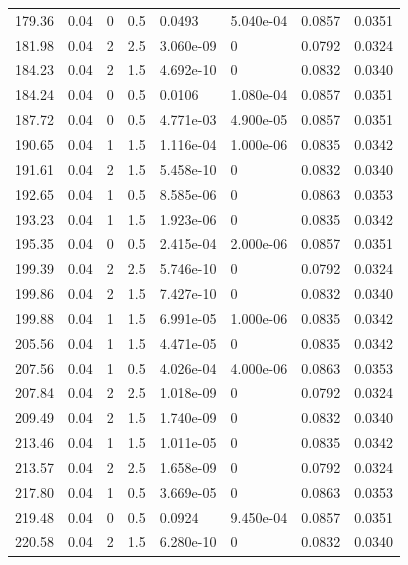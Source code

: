 \documentclass[preview]{standalone}
\begin{document}
{{{\begin{tabular}{L{1.2cm}C{1.2cm} C{0.3cm}C{0.5cm} C{1.4cm}C{1.4cm} C{1.4cm}C{1.4cm}}
  179.36  &  0.04  & 0     & 0.5 &  0.0493  & 5.040e-04  & 0.0857 &  0.0351   \\ 
  181.98  &  0.04  & 2     & 2.5 &  3.060e-09  & 0  & 0.0792 &  0.0324   \\ 
  184.23  &  0.04  & 2     & 1.5 &  4.692e-10  & 0  & 0.0832 &  0.0340   \\ 
  184.24  &  0.04  & 0     & 0.5 &  0.0106  & 1.080e-04  & 0.0857 &  0.0351   \\ 
  187.72  &  0.04  & 0     & 0.5 &  4.771e-03  & 4.900e-05  & 0.0857 &  0.0351   \\ 
  190.65  &  0.04  & 1     & 1.5 &  1.116e-04  & 1.000e-06  & 0.0835 &  0.0342   \\ 
  191.61  &  0.04  & 2     & 1.5 &  5.458e-10  & 0  & 0.0832 &  0.0340   \\ 
  192.65  &  0.04  & 1     & 0.5 &  8.585e-06  & 0  & 0.0863 &  0.0353   \\ 
  193.23  &  0.04  & 1     & 1.5 &  1.923e-06  & 0  & 0.0835 &  0.0342   \\ 
  195.35  &  0.04  & 0     & 0.5 &  2.415e-04  & 2.000e-06  & 0.0857 &  0.0351   \\ 
  199.39  &  0.04  & 2     & 2.5 &  5.746e-10  & 0  & 0.0792 &  0.0324   \\ 
  199.86  &  0.04  & 2     & 1.5 &  7.427e-10  & 0  & 0.0832 &  0.0340   \\ 
  199.88  &  0.04  & 1     & 1.5 &  6.991e-05  & 1.000e-06  & 0.0835 &  0.0342   \\ 
  205.56  &  0.04  & 1     & 1.5 &  4.471e-05  & 0  & 0.0835 &  0.0342   \\ 
  207.56  &  0.04  & 1     & 0.5 &  4.026e-04  & 4.000e-06  & 0.0863 &  0.0353   \\ 
  207.84  &  0.04  & 2     & 2.5 &  1.018e-09  & 0  & 0.0792 &  0.0324   \\ 
  209.49  &  0.04  & 2     & 1.5 &  1.740e-09  & 0  & 0.0832 &  0.0340   \\ 
  213.46  &  0.04  & 1     & 1.5 &  1.011e-05  & 0  & 0.0835 &  0.0342   \\ 
  213.57  &  0.04  & 2     & 2.5 &  1.658e-09  & 0  & 0.0792 &  0.0324   \\ 
  217.80  &  0.04  & 1     & 0.5 &  3.669e-05  & 0  & 0.0863 &  0.0353   \\ 
  219.48  &  0.04  & 0     & 0.5 &  0.0924  & 9.450e-04  & 0.0857 &  0.0351   \\ 
  220.58  &  0.04  & 2     & 1.5 &  6.280e-10  & 0  & 0.0832 &  0.0340   \\ 

\end{tabular}}}}
\end{document}
